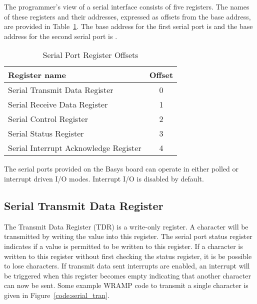 The programmer's view of a serial interface consists of five registers.
The names of these registers and their addresses, expressed as offsets
from the base address, are provided in
Table~\ref{table:serial_offsets}. The base address for the first
serial port is \src{\LOCFSPBASE} and the base address for the
second serial port is \src{\LOCSSPBASE}.

\begin{table}[h]
\begin{center}
\begin{tabular}{|l|c|}
\hline
\textbf{Register name} & \textbf{Offset} \\
\hline
Serial Transmit Data Register & 0 \\
\hline
Serial Receive Data Register & 1 \\
\hline
Serial Control Register & 2 \\
\hline
Serial Status Register & 3 \\
\hline
Serial Interrupt Acknowledge Register & 4 \\
\hline
\end{tabular}
\caption{Serial Port Register Offsets}
\label{table:serial_offsets}
\end{center}
\end{table}

The serial ports provided on the Basys board can operate in either
polled or interrupt driven I/O modes. Interrupt I/O is disabled
by default.

\subsection{Serial Transmit Data Register}

The Transmit Data Register (TDR) is a write-only register. A character
will be transmitted by writing the value into this register. The
serial port status register indicates if a value is permitted to be
written to this register. If a character is written to this register
without first checking the status register, it is be possible to lose
characters. If transmit data sent interrupts are enabled, an interrupt
will be triggered when this register becomes empty indicating that
another character can now be sent. Some example WRAMP code to transmit
a single character is given in Figure~\ref{code:serial_tran}.

